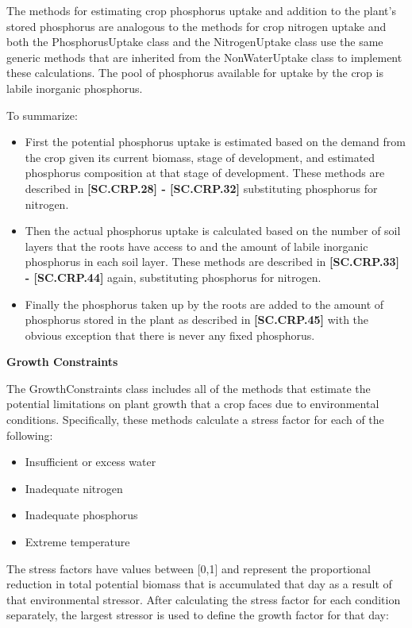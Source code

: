 The methods for estimating crop phosphorus uptake and addition to the plant’s stored phosphorus are analogous to the methods for crop nitrogen uptake and both the PhosphorusUptake class and the NitrogenUptake class use the same generic methods that are inherited from the NonWaterUptake class to implement these calculations. The pool of phosphorus available for uptake by the crop is labile inorganic phosphorus.

To summarize:
\begin{itemize}
    \item First the potential phosphorus uptake is estimated based on the demand from the crop given its current biomass, stage of development, and estimated phosphorus composition at that stage of development. These methods are described in \textbf{[SC.CRP.28] - [SC.CRP.32]} substituting phosphorus for nitrogen. 
    \item Then the actual phosphorus uptake is calculated based on the number of soil layers that the roots have access to and the amount of labile inorganic phosphorus in each soil layer. These methods are described in \textbf{[SC.CRP.33] - [SC.CRP.44]} again, substituting phosphorus for nitrogen. 
    \item Finally the phosphorus taken up by the roots are added to the amount of phosphorus stored in the plant as described in \textbf{[SC.CRP.45]} with the obvious exception that there is never any fixed phosphorus.
\end{itemize}


\textbf{\large Growth Constraints}
\vspace{0.2cm}

The GrowthConstraints class includes all of the methods that estimate the potential limitations on plant growth that a crop faces due to environmental conditions. Specifically, these methods calculate a stress factor for each of the following:
\begin{itemize}
    \item Insufficient or excess water
    \item Inadequate nitrogen 
    \item Inadequate phosphorus
    \item Extreme temperature
\end{itemize}

The stress factors have values between [0,1] and represent the proportional reduction in total potential biomass that is accumulated that day as a result of that environmental stressor. After calculating the stress factor for each condition separately, the largest stressor is used to define the growth factor for that day:
   \vspace{0.2cm}

